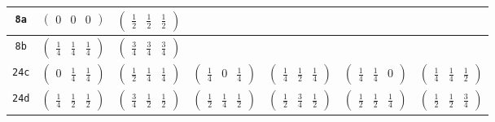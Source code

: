 \documentclass[fleqn,9pt,landscape]{jsarticle}
\begin{document}
\begin{center}
\begin{longtable}{ccccccc}
{\tt 8a} & $ \begin{pmatrix} 0 & 0 & 0 \end{pmatrix} $ & $ \begin{pmatrix} \frac{1}{2} & \frac{1}{2} & \frac{1}{2} \end{pmatrix} $ & $  $ & $  $ & $  $ & $  $ \\ \hline
{\tt 8b} & $ \begin{pmatrix} \frac{1}{4} & \frac{1}{4} & \frac{1}{4} \end{pmatrix} $ & $ \begin{pmatrix} \frac{3}{4} & \frac{3}{4} & \frac{3}{4} \end{pmatrix} $ & $  $ & $  $ & $  $ & $  $ \\ \hline
{\tt 24c} & $ \begin{pmatrix} 0 & \frac{1}{4} & \frac{1}{4} \end{pmatrix} $ & $ \begin{pmatrix} \frac{1}{2} & \frac{1}{4} & \frac{1}{4} \end{pmatrix} $ & $ \begin{pmatrix} \frac{1}{4} & 0 & \frac{1}{4} \end{pmatrix} $ & $ \begin{pmatrix} \frac{1}{4} & \frac{1}{2} & \frac{1}{4} \end{pmatrix} $ & $ \begin{pmatrix} \frac{1}{4} & \frac{1}{4} & 0 \end{pmatrix} $ & $ \begin{pmatrix} \frac{1}{4} & \frac{1}{4} & \frac{1}{2} \end{pmatrix} $ \\ \hline
{\tt 24d} & $ \begin{pmatrix} \frac{1}{4} & \frac{1}{2} & \frac{1}{2} \end{pmatrix} $ & $ \begin{pmatrix} \frac{3}{4} & \frac{1}{2} & \frac{1}{2} \end{pmatrix} $ & $ \begin{pmatrix} \frac{1}{2} & \frac{1}{4} & \frac{1}{2} \end{pmatrix} $ & $ \begin{pmatrix} \frac{1}{2} & \frac{3}{4} & \frac{1}{2} \end{pmatrix} $ & $ \begin{pmatrix} \frac{1}{2} & \frac{1}{2} & \frac{1}{4} \end{pmatrix} $ & $ \begin{pmatrix} \frac{1}{2} & \frac{1}{2} & \frac{3}{4} \end{pmatrix} $ \\ \hline

\end{longtable}
\end{center}
\end{document}
